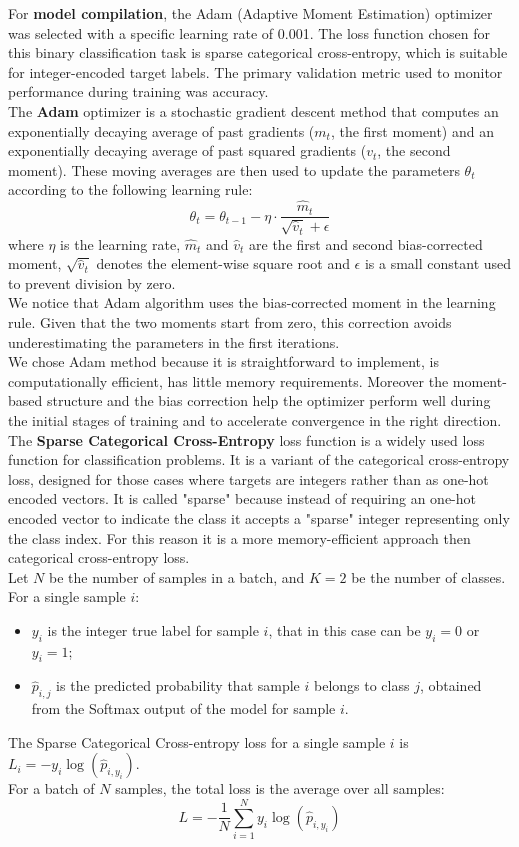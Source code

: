 \documentclass[10pt]{article}
\begin{document}
\noindent For \textbf{model compilation}, the Adam (Adaptive Moment Estimation) optimizer was selected with a specific learning rate of 0.001. The loss function chosen for this binary classification task is sparse categorical cross-entropy, which is suitable for integer-encoded target labels. The primary validation metric used to monitor performance during training was accuracy. \\

\noindent The \textbf{Adam} optimizer is a stochastic gradient descent method that computes an exponentially decaying average of past gradients ($m_t$, the first moment) and an exponentially decaying average of past squared gradients ($v_t$, the second moment). These moving averages are then used to update the parameters $\theta_t$ according to the following learning rule: 
$$\theta_t = \theta_{t-1} - \eta \cdot \frac{\hat{m}_t}{\sqrt{\hat{v}_t} + \epsilon}$$
where $\eta$ is the learning rate, $\hat{m}_t$ and $\hat{v}_t$ are the first and second bias-corrected moment, $\sqrt{\hat{v}_t}$ denotes the element-wise square root and $\epsilon$ is a small constant used to prevent division by zero. \\
We notice that Adam algorithm uses the bias-corrected moment in the learning rule. Given that the two moments start from zero, this correction avoids underestimating the parameters in the first iterations.\\
We chose Adam method because it is straightforward to implement, is computationally efficient, has little memory requirements. Moreover the moment-based structure and the bias correction help the optimizer perform well during the initial stages of training and to accelerate convergence in the right direction. \\

\noindent The \textbf{Sparse Categorical Cross-Entropy} loss function is a widely used loss function for classification problems. It is a variant of the categorical cross-entropy loss, designed for those cases where targets are integers rather than as one-hot encoded vectors. It is called "sparse" because instead of requiring an one-hot encoded vector to indicate the class it accepts a "sparse" integer representing only the class index. For this reason it is a more memory-efficient approach then categorical cross-entropy loss. \\
Let $N$ be the number of samples in a batch, and $K = 2$ be the number of classes.
For a single sample $i$:
\begin{itemize}
    \item $y_i$ is the integer true label for sample $i$, that in this case can be $y_i = 0$ or $y_i = 1$;
    \item $\hat{p}_{i, j}$ is the predicted probability that sample $i$ belongs to class $j$, obtained from the Softmax output of the model for sample $i$.
\end{itemize}
The Sparse Categorical Cross-entropy loss for a single sample $i$ is $L_i = - y_i \log(\hat{p}_{i, y_i})$. \\
For a batch of $N$ samples, the total loss is the average over all samples:
$$L = - \frac{1}{N} \sum_{i=1}^{N} y_i \log(\hat{p}_{i, y_i})$$
\end{document}
